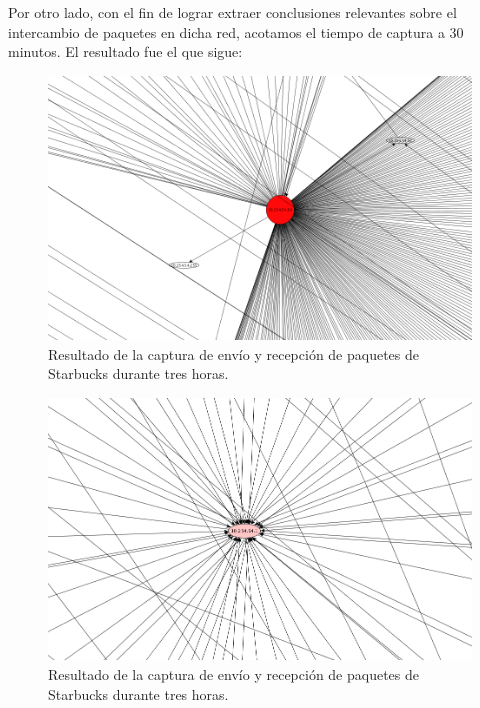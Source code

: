 \documentclass[10pt, a4paper]{article}
\begin{document}
Por otro lado, con el fin de lograr extraer conclusiones relevantes sobre el intercambio de paquetes en dicha red, acotamos el tiempo de captura a 30 minutos. El resultado fue el que sigue:

\begin{figure}[H] %
\begin{center}
\includegraphics[width=400pt]{../imgs/starbucks30_1.png}
\caption{Resultado de la captura de envío y recepción de paquetes de Starbucks durante tres horas.}
\end{center}
\end{figure}

\begin{figure}[H] %
\begin{center}
\includegraphics[width=400pt]{../imgs/starbucks30_2.png}
\caption{Resultado de la captura de envío y recepción de paquetes de Starbucks durante tres horas.}
\end{center}
\end{figure}
\end{document}
